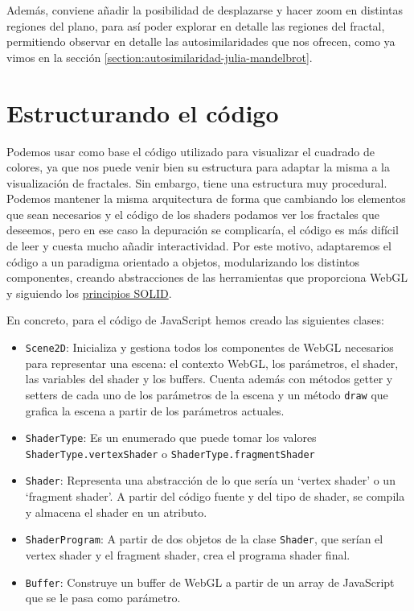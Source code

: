 Además, conviene añadir la posibilidad de desplazarse y hacer zoom en distintas regiones del plano, para así poder explorar en detalle las regiones del fractal, permitiendo observar en detalle las autosimilaridades que nos ofrecen, como ya vimos en la sección \ref{section:autosimilaridad-julia-mandelbrot}. 


\section{Estructurando el código}
\label{section:codigo}

Podemos usar como base el código utilizado para visualizar el cuadrado de colores, ya que nos puede venir bien su estructura para adaptar la misma a la visualización de fractales. Sin embargo, tiene una estructura muy procedural. Podemos mantener la misma arquitectura de forma que cambiando los elementos que sean necesarios y el código de los shaders podamos ver los fractales que deseemos, pero en ese caso la depuración se complicaría, el código es más difícil de leer y cuesta mucho añadir interactividad. Por este motivo, adaptaremos el código a un paradigma orientado a objetos, modularizando los distintos componentes, creando abstracciones de las herramientas que proporciona WebGL y siguiendo los \href{https://medium.com/backticks-tildes/the-s-o-l-i-d-principles-in-pictures-b34ce2f1e898}{principios SOLID}.

En concreto, para el código de JavaScript hemos creado las siguientes clases:
\begin{itemize}
    \item \verb|Scene2D|: Inicializa y gestiona todos los componentes de WebGL necesarios para representar una escena: el contexto WebGL, los parámetros, el shader, las variables del shader y los buffers. Cuenta además con métodos getter y setters de cada uno de los parámetros de la escena y un método \verb|draw| que grafica la escena a partir de los parámetros actuales.
    \item \verb|ShaderType|: Es un enumerado que puede tomar los valores \verb|ShaderType.vertexShader| o \verb|ShaderType.fragmentShader|
    \item \verb|Shader|: Representa una abstracción de lo que sería un `vertex shader' o un `fragment shader'. A partir del código fuente y del tipo de shader, se compila y almacena el shader en un atributo.
    \item \verb|ShaderProgram|: A partir de dos objetos de la clase \verb|Shader|, que serían el vertex shader y el fragment shader, crea el programa shader final.
    \item \verb|Buffer|: Construye un buffer de WebGL a partir de un array de JavaScript que se le pasa como parámetro.
\end{itemize}

